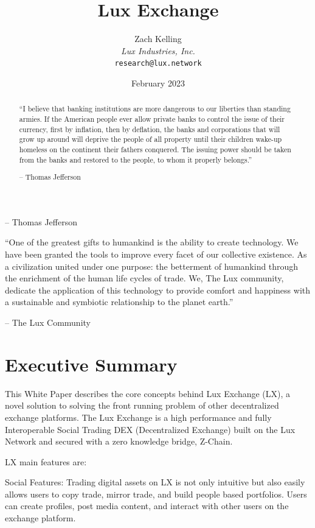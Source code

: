 \documentclass[11pt]{article}
\title{Lux Exchange}
\author{Zach Kelling\\\textit{Lux Industries, Inc.}\\\texttt{research@lux.network}}
\date{February 2023}
\begin{document}
\luxcoverpage

\begin{abstract}
``I believe that banking institutions are more dangerous to our liberties than standing armies. If the American people ever allow private banks to control the issue of their currency, first by inflation, then by deflation, the banks and corporations that will grow up around will deprive the people of all property until their children wake-up homeless on the continent their fathers conquered. The issuing power should be taken from the banks and restored to the people, to whom it properly belongs.''

-- Thomas Jefferson
\end{abstract}

\tableofcontents
\newpage


-- Thomas Jefferson


``One of the greatest gifts to humankind is the ability to create technology. We have been granted the tools to improve every facet of our collective existence. As a civilization united under one purpose: the betterment of humankind through the enrichment of the human life cycles of trade. We, The Lux community, dedicate the application of this technology to provide comfort and happiness with a sustainable and symbiotic relationship to the planet earth.''


-- The Lux Community


\section{Executive Summary}

This White Paper describes the core concepts behind Lux Exchange (LX), a novel solution to solving the front running problem of other decentralized exchange platforms. The Lux Exchange is a high performance and fully  Interoperable Social Trading DEX (Decentralized Exchange) built on the Lux Network and secured with a zero knowledge bridge, Z-Chain.


LX main features are:


Social Features: Trading digital assets on LX is not only intuitive but also easily allows users to copy trade, mirror trade, and build people based portfolios. Users can create profiles, post media content, and interact with other users on the exchange platform.
\end{document}
